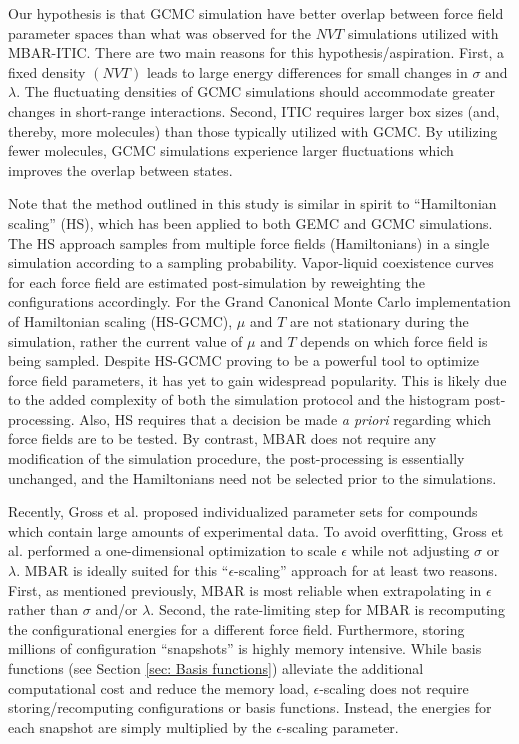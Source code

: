 \documentclass[journal=jced,manuscript=article]{achemso}
\begin{document}
Our hypothesis is that GCMC simulation have better overlap between force field parameter spaces than what was observed for the $NVT$ simulations utilized with MBAR-ITIC. There are two main reasons for this hypothesis/aspiration. First, a fixed density $(NVT)$ leads to large energy differences for small changes in $\sigma$ and $\lambda$. The fluctuating densities of GCMC simulations should accommodate greater changes in short-range interactions. Second, ITIC requires larger box sizes (and, thereby, more molecules) than those typically utilized with GCMC. By utilizing fewer molecules, GCMC simulations experience larger fluctuations which improves the overlap between states.

Note that the method outlined in this study is similar in spirit to ``Hamiltonian scaling'' (HS), which has been applied to both GEMC and GCMC simulations. The HS approach samples from multiple force fields (Hamiltonians) in a single simulation according to a sampling probability. Vapor-liquid coexistence curves for each force field are estimated post-simulation by reweighting the configurations accordingly. For the Grand Canonical Monte Carlo implementation of Hamiltonian scaling (HS-GCMC), $\mu$ and $T$ are not stationary during the simulation, rather the current value of $\mu$ and $T$ depends on which force field is being sampled. Despite HS-GCMC proving to be a powerful tool to optimize force field parameters, it has yet to gain widespread popularity. This is likely due to the added complexity of both the simulation protocol and the histogram post-processing. Also, HS requires that a decision be made \textit{a priori} regarding which force fields are to be tested. By contrast, MBAR does not require any modification of the simulation procedure, the post-processing is essentially unchanged, and the Hamiltonians need not be selected prior to the simulations.

Recently, Gross et al. proposed individualized parameter sets for compounds which contain large amounts of experimental data. To avoid overfitting, Gross et al. performed a one-dimensional optimization to scale $\epsilon$ while not adjusting $\sigma$ or $\lambda$. MBAR is ideally suited for this ``$\epsilon$-scaling'' approach for at least two reasons. First, as mentioned previously, MBAR is most reliable when extrapolating in $\epsilon$ rather than $\sigma$ and/or $\lambda$. Second, the rate-limiting step for MBAR is recomputing the configurational energies for a different force field. Furthermore, storing millions of configuration ``snapshots'' is highly memory intensive. While basis functions (see Section \ref{sec: Basis functions}) alleviate the additional computational cost and reduce the memory load, $\epsilon$-scaling does not require storing/recomputing configurations or basis functions. Instead, the energies for each snapshot are simply multiplied by the $\epsilon$-scaling parameter.  
\end{document}
